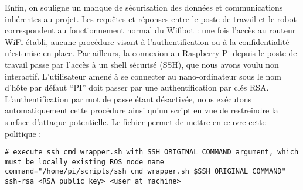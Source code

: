 Enfin, on souligne un manque de sécurisation des données et communications inhérentes au projet. 
Les requêtes et réponses entre le poste de travail et le robot correspondent au fonctionnement normal du Wifibot :
une fois l'accès au routeur WiFi établi, aucune procédure visant à l'authentification ou à la confidentialité n'est mise en place.
Par ailleurs, la connexion au Raspberry Pi depuis le poste de travail passe par l'accès à un shell sécurisé (SSH), que nous avons voulu non interactif. 
L'utilisateur amené à se connecter au nano-ordinateur sous le nom d'hôte par défaut ``PI'' doit passer par une authentification par clés RSA.
L'authentification par mot de passe étant désactivée, nous exécutons automatiquement cette procédure ainsi qu'un script en vue de restreindre la surface d'attaque potentielle. 
Le fichier  permet de mettre en \oe{}uvre cette politique :  
\begin{lstlisting}[style = custombash]
# execute ssh_cmd_wrapper.sh with SSH_ORIGINAL_COMMAND argument, which must be locally existing ROS node name
command="/home/pi/scripts/ssh_cmd_wrapper.sh $SSH_ORIGINAL_COMMAND" ssh-rsa <RSA public key> <user at machine>
\end{lstlisting}

